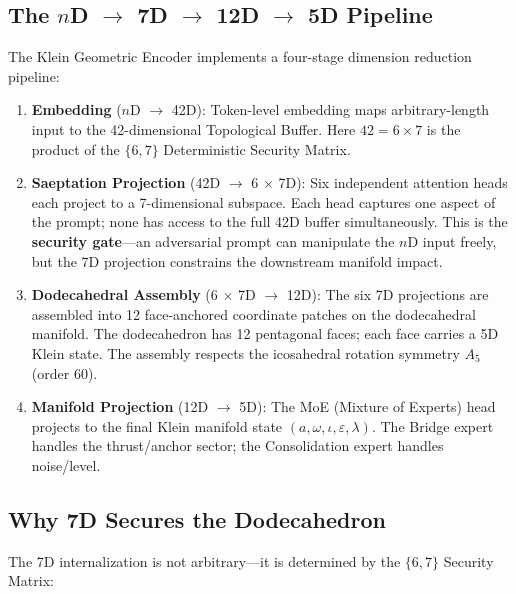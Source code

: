 \subsection{The $n$D $\to$ 7D $\to$ 12D $\to$ 5D Pipeline}

The Klein Geometric Encoder implements a four-stage dimension reduction pipeline:

\begin{enumerate}[noitemsep]
  \item \textbf{Embedding} ($n$D $\to$ 42D): Token-level embedding maps arbitrary-length input to the 42-dimensional Topological Buffer. Here $42 = 6 \times 7$ is the product of the $\{6, 7\}$ Deterministic Security Matrix.
  \item \textbf{Saeptation Projection} (42D $\to$ 6 $\times$ 7D): Six independent attention heads each project to a 7-dimensional subspace. Each head captures one aspect of the prompt; none has access to the full 42D buffer simultaneously. This is the \textbf{security gate}---an adversarial prompt can manipulate the $n$D input freely, but the 7D projection constrains the downstream manifold impact.
  \item \textbf{Dodecahedral Assembly} (6 $\times$ 7D $\to$ 12D): The six 7D projections are assembled into 12 face-anchored coordinate patches on the dodecahedral manifold. The dodecahedron has 12 pentagonal faces; each face carries a 5D Klein state. The assembly respects the icosahedral rotation symmetry $A_5$ (order 60).
  \item \textbf{Manifold Projection} (12D $\to$ 5D): The MoE (Mixture of Experts) head projects to the final Klein manifold state $(a, \omega, \iota, \varepsilon, \lambda)$. The Bridge expert handles the thrust/anchor sector; the Consolidation expert handles noise/level.
\end{enumerate}

\subsection{Why 7D Secures the Dodecahedron}

The 7D internalization is not arbitrary---it is determined by the $\{6, 7\}$ Security Matrix:

